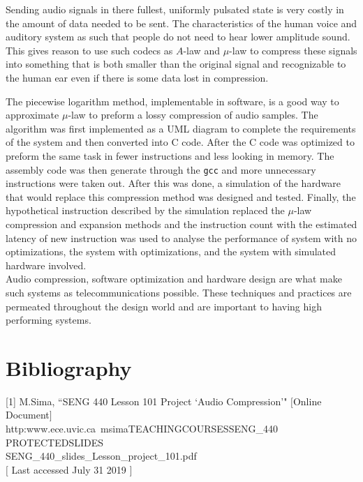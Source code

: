 \documentclass[12pt]{article}
\begin{document}
Sending audio signals in there fullest, uniformly pulsated state is very costly in the amount of data needed to be sent. The characteristics of the human voice and auditory system as such that people do not need to hear lower amplitude sound. This gives reason to use such codecs as $A$-law and $\mu$-law to compress these signals into something that is both smaller than the original signal and recognizable to the human ear even if there is some data lost in compression. 

The piecewise logarithm method, implementable in software, is a good way to approximate $\mu$-law to preform a lossy compression of audio samples. The algorithm was first implemented as a UML diagram to complete the requirements of the system and then converted into C code. After the C code was optimized to preform the same task in fewer instructions and less looking in memory. The assembly code was then generate through the \texttt{gcc} and more unnecessary instructions were taken out. After this was done, a simulation of the hardware that would replace this compression method was designed and tested. Finally, the hypothetical instruction described by the simulation replaced the $\mu$-law compression and expansion methods and the instruction count with the estimated latency of new instruction was used to analyse the performance of system with no optimizations, the system with optimizations, and the system with simulated hardware involved.\\

Audio compression, software optimization and hardware design are what make such systems as telecommunications possible. These techniques and practices are permeated throughout the design world and are important to having high performing systems.\\
   

\newpage
\section{Bibliography}
[1] M.Sima, ``SENG 440 Lesson 101 Project ‘Audio Compression’" $[$Online Document$]$\\
http:\/\/www.ece.uvic.ca\/~msima\/TEACHING\/COURSES\/SENG\_440\/
PROTECTED\/SLIDES\\\/SENG\_440\_slides\_Lesson\_project\_101.pdf\\
$[$ Last accessed July 31 2019 $]$
\end{document}
